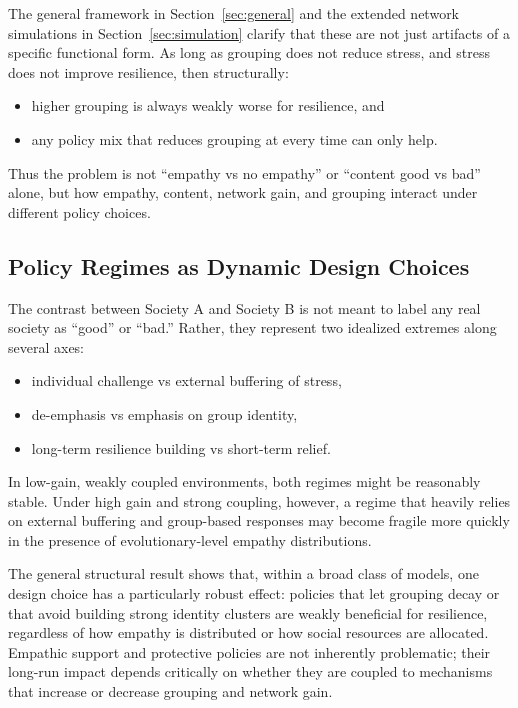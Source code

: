 \documentclass[11pt]{article}
\theoremstyle{plain}
\begin{document}
The general framework in Section~\ref{sec:general} and the extended network simulations in Section~\ref{sec:simulation} clarify that these are not just artifacts of a specific functional form.
As long as grouping does not reduce stress, and stress does not improve resilience, then structurally:
\begin{itemize}
  \item higher grouping is always weakly worse for resilience, and
  \item any policy mix that reduces grouping at every time can only help.
\end{itemize}

Thus the problem is not ``empathy vs no empathy'' or ``content good vs bad'' alone, but how empathy, content, network gain, and grouping interact under different policy choices.

\subsection{Policy Regimes as Dynamic Design Choices}

The contrast between Society A and Society B is not meant to label any real society as ``good'' or ``bad.''
Rather, they represent two idealized extremes along several axes:
\begin{itemize}
  \item individual challenge vs external buffering of stress,
  \item de-emphasis vs emphasis on group identity,
  \item long-term resilience building vs short-term relief.
\end{itemize}

In low-gain, weakly coupled environments, both regimes might be reasonably stable.
Under high gain and strong coupling, however, a regime that heavily relies on external buffering and group-based responses may become fragile more quickly in the presence of evolutionary-level empathy distributions.

The general structural result shows that, within a broad class of models, one design choice has a particularly robust effect:
policies that let grouping decay or that avoid building strong identity clusters are weakly beneficial for resilience, regardless of how empathy is distributed or how social resources are allocated.
Empathic support and protective policies are not inherently problematic; their long-run impact depends critically on whether they are coupled to mechanisms that increase or decrease grouping and network gain.
\end{document}
